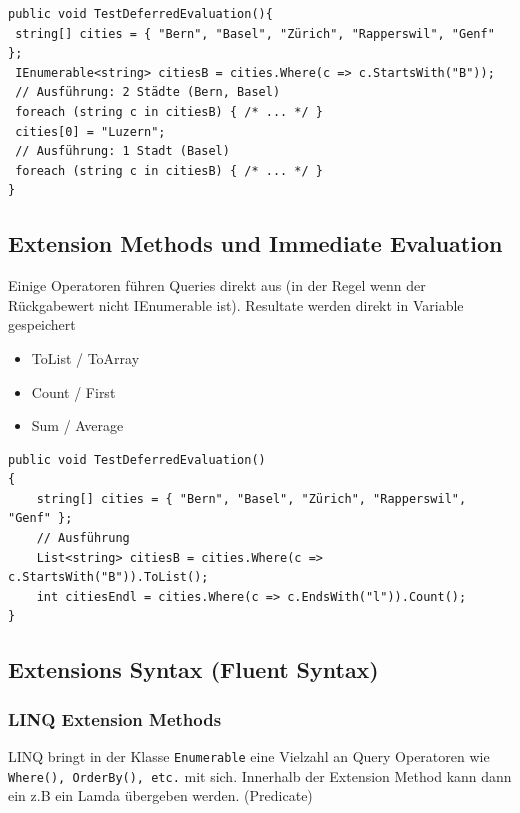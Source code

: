 \documentclass[
a4paper,
oneside,
10pt,
fleqn,
headsepline,
toc=listofnumbered, 
bibliography=totocnumbered]{scrartcl}
\begin{document}
\begin{lstlisting}
public void TestDeferredEvaluation(){
 string[] cities = { "Bern", "Basel", "Zürich", "Rapperswil", "Genf" };
 IEnumerable<string> citiesB = cities.Where(c => c.StartsWith("B"));
 // Ausführung: 2 Städte (Bern, Basel)
 foreach (string c in citiesB) { /* ... */ } 
 cities[0] = "Luzern"; 
 // Ausführung: 1 Stadt (Basel)
 foreach (string c in citiesB) { /* ... */ }
} 
\end{lstlisting}

\subsection{Extension Methods und Immediate Evaluation}
Einige Operatoren führen Queries direkt aus (in der Regel wenn der Rückgabewert nicht IEnumerable ist). Resultate werden direkt in Variable gespeichert
\begin{itemize}
	\item ToList / ToArray
	\item Count / First
	\item Sum / Average
\end{itemize}
\begin{lstlisting}
public void TestDeferredEvaluation()
{
    string[] cities = { "Bern", "Basel", "Zürich", "Rapperswil", "Genf" };
    // Ausführung
    List<string> citiesB = cities.Where(c => c.StartsWith("B")).ToList();
    int citiesEndl = cities.Where(c => c.EndsWith("l")).Count();
}
\end{lstlisting}


\subsection{Extensions Syntax (Fluent Syntax)}
\subsubsection{LINQ Extension Methods}
LINQ bringt in der Klasse \lstinline|Enumerable| eine Vielzahl an Query Operatoren wie \lstinline|Where(), OrderBy(), etc.| mit sich. Innerhalb der Extension Method kann dann ein z.B ein Lamda übergeben werden. (Predicate)
\end{document}
